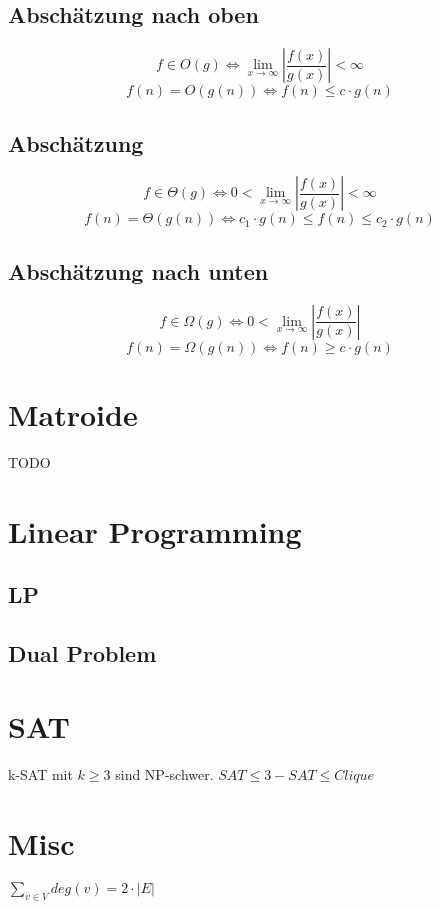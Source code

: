 \documentclass[10pt,a4paper]{article}
\newcommand{\abs}[1]{\ensuremath{\left\vert#1\right\vert}}
\begin{document}
\subsection{Abschätzung nach oben}
\[f \in O(g) \Leftrightarrow \lim_{x \rightarrow \infty} \abs{\frac{f(x)}{g(x)}} < \infty \]
\[f(n) = O(g(n)) \Leftrightarrow f(n) \leq c \cdot g(n)\]
\subsection{Abschätzung}
\[f \in \Theta(g) \Leftrightarrow 0 <\lim_{x \rightarrow \infty} \abs{\frac{f(x)}{g(x)}} < \infty \]
\[f(n) = \Theta(g(n)) \Leftrightarrow c_1 \cdot g(n) \leq f(n) \leq c_2 \cdot g(n)\]
\subsection{Abschätzung nach unten}
\[f \in \Omega(g) \Leftrightarrow 0 < \lim_{x \rightarrow \infty} \abs{\frac{f(x)}{g(x)}} \]
\[f(n) = \Omega(g(n)) \Leftrightarrow f(n) \geq c \cdot g(n)\]
\section{Matroide}
TODO
\section{Linear Programming}
\subsection{LP}
\subsection{Dual Problem}
\section{SAT}
k-SAT mit $k \geq 3$ sind NP-schwer.
$SAT \leq 3-SAT \leq Clique$
\section{Misc}
$\sum\limits_{v \in V} deg(v) = 2 \cdot |E|$
\end{document}
